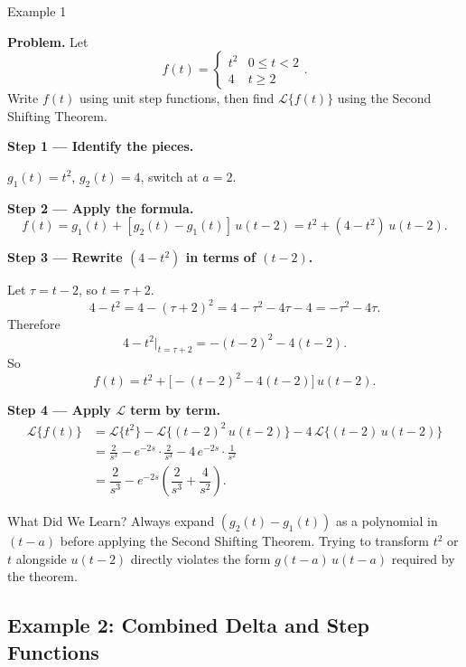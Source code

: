 \documentclass[12pt,a4paper]{article}
\begin{document}
\begin{infobox}{Example 1}

\textbf{Problem.} Let
\[
  f(t) = \begin{cases} t^2 & 0 \leq t < 2 \\ 4 & t \geq 2 \end{cases}.
\]
Write $f(t)$ using unit step functions, then find $\mathcal{L}\{f(t)\}$ using
the Second Shifting Theorem.

\medskip
\textbf{Step 1 --- Identify the pieces.}

$g_1(t) = t^2$, $g_2(t) = 4$, switch at $a = 2$.

\textbf{Step 2 --- Apply the formula.}
\[
  f(t) = g_1(t) + [g_2(t) - g_1(t)]\,u(t-2)
       = t^2 + (4 - t^2)\,u(t-2).
\]

\textbf{Step 3 --- Rewrite $(4 - t^2)$ in terms of $(t-2)$.}

Let $\tau = t - 2$, so $t = \tau + 2$.
\[
  4 - t^2 = 4 - (\tau+2)^2 = 4 - \tau^2 - 4\tau - 4 = -\tau^2 - 4\tau.
\]
Therefore
\[
  4 - t^2 \big|_{t=\tau+2} = -(t-2)^2 - 4(t-2).
\]
So
\[
  f(t) = t^2 + \bigl[-(t-2)^2 - 4(t-2)\bigr]\,u(t-2).
\]

\textbf{Step 4 --- Apply $\mathcal{L}$ term by term.}
\begin{align*}
  \mathcal{L}\{f(t)\}
  &= \mathcal{L}\{t^2\}
     - \mathcal{L}\{(t-2)^2\,u(t-2)\}
     - 4\,\mathcal{L}\{(t-2)\,u(t-2)\} \\
  &= \frac{2}{s^3}
     - e^{-2s}\cdot\frac{2}{s^3}
     - 4\,e^{-2s}\cdot\frac{1}{s^2} \\[6pt]
  &= \boxed{\dfrac{2}{s^3} - e^{-2s}\!\left(\dfrac{2}{s^3}
     + \dfrac{4}{s^2}\right)}.
\end{align*}

\end{infobox}

\begin{learnbox}{What Did We Learn?}
Always expand $(g_2(t) - g_1(t))$ as a polynomial in $(t - a)$ before applying
the Second Shifting Theorem. Trying to transform $t^2$ or $t$ alongside
$u(t-2)$ directly violates the form $g(t-a)\,u(t-a)$ required by the theorem.
\end{learnbox}

\subsection{Example 2: Combined Delta and Step Functions}
\end{document}
